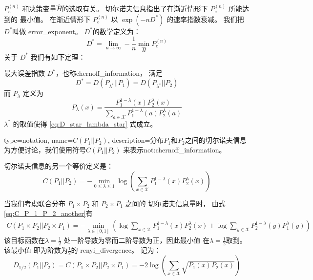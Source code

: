 $P_e^{(n)}$ 和决策变量$\widehat{H}$的选取有关。
切尔诺夫信息指出了在渐近情形下 $P_e^{(n)}$ 所能达到的
最小值。
在渐近情形下 $P_e^{(n)}$ 以 $\exp(-n D^*)$ 的速率指数衰减。
我们把$D^*$叫做 \gls{error_exponent}。
$D^*$的数学定义为：
\begin{equation}
 D^* = \lim_{n\to \infty} -\frac{1}{n} \min_{\widehat{H}}
 P^{(n)}_e
\end{equation}
关于 $D^*$ 我们有如下定理：
\begin{theorem}
  最大误差指数 $D^*$，也称\gls{chernoff_information}， 满足
  \begin{equation}\label{eq:D_star_lambda_star}
    D^* = D(P_{\lambda^*} || P_1) = D(P_{\lambda^*}|| P_2)
  \end{equation}
  而 $P_{\lambda}$ 定义为
  \begin{equation}\label{eq:P_lambda_x}
    P_{\lambda}(x) = \frac{P^{1-\lambda}_1 (x) P^{\lambda}_2 (x)}
    {\sum_{a \in \mathcal{X}} P^{1-\lambda}_1 (a) P^{\lambda}_2 (a)}
  \end{equation}
  $\lambda^*$ 的取值使得  \eqref{eq:D_star_lambda_star} 式成立。
\end{theorem}

{
  type=notation,
  name={$C(P_1||P_2)$},
  description={分布$P_1$和$P_2$之间的切尔诺夫信息}
}
为方便讨论，我们使用符号$C(P_1||P_2)$
来表示\glsdesc{not:chernoff_information}。

切尔诺夫信息的另一个等价定义是：
\begin{equation}\label{eq:C_P_1_P_2_another}
  C(P_1||P_2) = -\min_{0\leq \lambda \leq 1}
  \log \left(\sum_{x \in \mathcal{X}}
  P^{1-\lambda}_1(x)P^{\lambda}_2(x)
  \right)
\end{equation}

当我们考虑联合分布 $P_1 \times P_2$
和 $P_2 \times P_1$ 之间的  切尔诺夫信息量时，
由式 \eqref{eq:C_P_1_P_2_another}有
\begin{align*}
  C(P_1 \times P_2||P_2 \times P_1) 
  = -\min_{\lambda \in [0,1]}
  \left(\log \sum_{x\in \mathcal{X}}
  P_1^{1-\lambda}(x) P_2^{\lambda}(x) 
  +\log \sum_{y\in \mathcal{X}}
  P_2^{1-\lambda}(y) P_1^{\lambda}(y) 
  \right)
  \end{align*}
该目标函数在$\lambda=\frac{1}{2}$
处一阶导数为零而二阶导数为正，因此最小值
在$\lambda=\frac{1}{2}$取到。该最小值
即为阶数为$\frac{1}{2}$的 \gls{renyi_divergence}。
记为：
\begin{equation}\label{eq:renyi_divergence}
  D_{1/2}(P_1 || P_2) = C(P_1 \times P_2||P_2 \times P_1)=
  -2\log \left(\sum_{x \in \mathcal{X}}
  \sqrt{P_1(x)P_2(x)} \right)
\end{equation}

